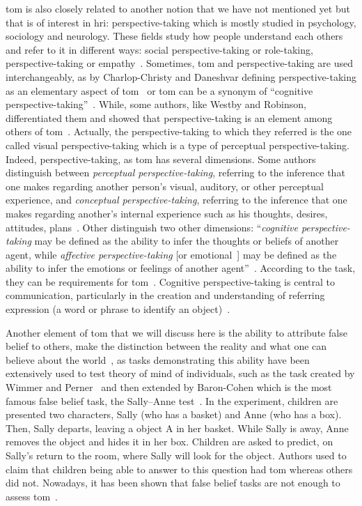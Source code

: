 \documentclass[a4paper,11pt,twoside]{StyleThese}
\begin{document}
\acrshort{tom} is also closely related to another notion that we have not mentioned yet but that is of interest in \acrshort{hri}: perspective-taking which is mostly studied in psychology, sociology and neurology. These fields study how people understand each others and refer to it in different ways: social perspective-taking or role-taking, perspective-taking or empathy~\cite{davis_2017_self}. Sometimes, \acrshort{tom} and perspective-taking are used interchangeably, as by Charlop-Christy and Daneshvar defining perspective-taking as an elementary aspect of \acrshort{tom}~\cite{charlop_2003_using} or \acrshort{tom} can be a synonym of ``cognitive perspective-taking''~\cite{barnes_2004_perspective}. While, some authors, like Westby and Robinson, differentiated them and showed that perspective-taking is an element among others of \acrshort{tom}~\cite{westby_2014_developmental}. Actually, the perspective-taking to which they referred is the one called visual perspective-taking which is a type of perceptual perspective-taking. Indeed, perspective-taking, as \acrshort{tom} has several dimensions. Some authors distinguish between \emph{perceptual perspective-taking}, referring to the inference that one makes regarding another person's visual, auditory, or other perceptual experience, and \emph{conceptual perspective-taking}, referring to the inference that one makes regarding another's internal experience such as his thoughts, desires, attitudes, plans~\cite{marvin_1976_early}. Other distinguish two other dimensions: ``\emph{cognitive perspective-taking} may be defined as the ability to infer the thoughts or beliefs of another agent, while \emph{affective perspective-taking} [or emotional~\cite{hynes_2006_differential}] may be defined as the ability to infer the emotions or feelings of another agent''~\cite{healey_2018_cognitive}. According to the task, they can be requirements for \acrshort{tom}~\cite{hynes_2006_differential}. Cognitive perspective-taking is central to communication, particularly in the creation and understanding of referring expression (\ie a word or phrase to identify an object)~\cite{krauss_1991_perspective}.

Another element of \acrshort{tom} that we will discuss here is the ability to attribute false belief to others, \ie make the distinction between the reality and what one can believe about the world~\cite{dennett_1978_brainstorms}, as tasks demonstrating this ability have been extensively used to test theory of mind of individuals, such as the task created by Wimmer and Perner~\cite{wimmer_1983_beliefs} and then extended by Baron-Cohen \etal{} which is the most famous false belief task, the Sally--Anne test~\cite{wimmer_1983_beliefs, baron_1985_does}. In the experiment, children are presented two characters, Sally (who has a basket) and Anne (who has a box). Then, Sally departs, leaving a object A in her basket. While Sally is away, Anne removes the object and hides it in her box. Children are asked to predict, on Sally's return to the room, where Sally will look for the object. Authors used to claim that children being able to answer to this question had \acrshort{tom} whereas others did not. Nowadays, it has been shown that false belief tasks are not enough to assess \acrshort{tom}~\cite{bloom_2000_two, wellman_2001_meta}.
\end{document}
